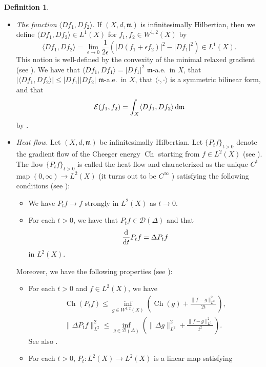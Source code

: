 \documentclass[pdftex]{sigma}
\numberwithin{equation}{section}
\theoremstyle{definition}
\newtheorem{Def}[Thm]{Definition}
\newcommand{\Ch}{\operatorname{Ch}}
\newcommand{\mf}{\mathfrak{m}}
\newcommand{\D}{\mathcal{D}}
\begin{document}
\begin{Def}
\begin{itemize}
\[\begin{array}{@{}l@{}}
\text{$\mathcal{E}(f,g)=-\int_X g \Delta f \,{\rm d}\mf$ for any $g\in W^{1,2}(X)$}\end{array}  \right\} .
\]
For each $f\in \D(\Delta)$, $\Delta f\in L^2(X)$ is uniquely determined.
\item \emph{The function} $\langle D f_1,D f_2\rangle$. If $(X,d,\mf)$ is infinitesimally Hilbertian, then we define \linebreak $\langle D f_1,D f_2\rangle\in L^1(X)$ for $f_1,f_2\in W^{1,2}(X)$ by
\[
\langle D f_1,D f_2\rangle=\lim_{\epsilon\to 0}\frac{1}{2\epsilon}(|D (f_1+\epsilon f_2)|^2-|D f_1|^2)\in L^1(X).
\]
This notion is well-defined by the convexity of the minimal relaxed gradient (see \cite[Definition~4.12]{AGS2}).
We have that $\langle D f_1,D f_1\rangle=|D f_1|^2$ $\mf$-a.e.\ in $X$, that $|\langle D f_1, D f_2\rangle|\leq |D f_1| |D f_2 |$ $\mf$-a.e.\ in $X$, that $\langle\cdot,\cdot\rangle$ is a symmetric bilinear form, and that
\[
\mathcal{E}(f_1,f_2)=\int_X \langle D f_1,D f_2\rangle\,{\rm d}\mf
\]
by \cite[Propositions 4.13 and 4.14, Theorem~4.18]{AGS2}.
\item \emph{Heat flow}. Let $(X,d,\mf)$ be infinitesimally Hilbertian.
Let $\{P_t f\}_{t>0}$ denote the gradient flow of the Cheeger energy $\Ch$ starting from $f\in L^2(X)$ (see \cite[Definition~5.2.5]{GP}).
The flow $\{P_t f\}_{t>0}$ is called the heat flow and characterized as the unique $C^1$ map $(0,\infty)\to L^2(X)$ (it turns out to be $C^\infty$ \cite[Proposition~5.2.12]{GP}) satisfying the following conditions (see \cite[Theorem~5.1.12]{GP}):
\begin{itemize}\itemsep=0pt
\item We have $P_t f\to f$ strongly in $L^2(X)$ as $t\to 0$.
\item For each $t>0$, we have that $P_t f\in \D(\Delta)$ and that
\[
\frac{\rm d}{{\rm d} t}P_t f =\Delta P_t f
\]
in $L^2(X)$.
\end{itemize}
Moreover, we have the following properties (see \cite[Section 5.2.2]{GP}):
\begin{itemize}\itemsep=0pt
\item For each $t>0$ and $f\in L^2(X)$, we have
\begin{gather*}
\Ch(P_t f)\leq \inf_{g\in W^{1,2}(X)}\left(\Ch(g)+\frac{\|f-g\|_{L^2}^2}{2t}\right),
\\
\|\Delta P_t f\|_{L^2}^2\leq \inf_{g\in \D(\Delta)}
\left(\|\Delta g\|_{L^2}^2+\frac{\|f-g\|_{L^2}^2}{t^2}\right).
\end{gather*}
See also \cite[Theorem~5.1.12]{GP}.
\item For each $t>0$, $P_t\colon L^2(X)\to L^2(X)$ is a linear map satisfying

\end{itemize}
\end{itemize}
\end{Def}
\end{document}

